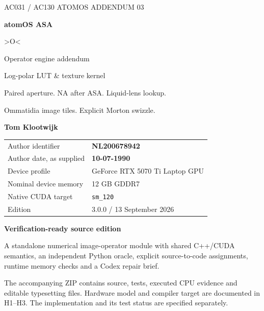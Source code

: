 \documentclass[11pt,a4paper]{article}
\newcommand{\code}[1]{\texttt{#1}}
\begin{document}
\begin{titlepage}
\thispagestyle{empty}
{\sffamily\color{accent}\large AC031 / AC130 ATOMOS \hfill ADDENDUM 03}\par
\vspace{19mm}
{\sffamily\bfseries\fontsize{61}{65}\selectfont\color{ink}atomOS ASA}\par
\vspace{5mm}
{\sffamily\fontsize{40}{44}\selectfont\color{gold}>O<}\par
\vspace{8mm}
{\sffamily\fontsize{25}{31}\selectfont\color{ink}Operator engine addendum\par
Log-polar LUT \& texture kernel}\par
\vspace{8mm}
{\large Paired aperture. NA after ASA. Liquid-lens lookup.\par
Ommatidia image tiles. Explicit Morton swizzle.}\par
\vspace{14mm}
{\sffamily\bfseries\Large Tom Klootwijk}\par
\begin{tabular}{@{}ll@{}}
Author identifier & \textbf{NL200678942}\\
Author date, as supplied & \textbf{10-07-1990}\\
Device profile & GeForce RTX 5070 Ti Laptop GPU\\
Nominal device memory & 12 GB GDDR7\\
Native CUDA target & \code{sm\_120}\\
Edition & 3.0.0 / 13 September 2026\\
\end{tabular}
\vfill
\begin{panel}
\textbf{Verification-ready source edition}\par
A standalone numerical image-operator module with shared C++/CUDA semantics, an independent Python oracle, explicit source-to-code assignments, runtime memory checks and a Codex repair brief.
\end{panel}
{\small\color{muted}The accompanying ZIP contains source, tests, executed CPU evidence and editable typesetting files. Hardware model and compiler target are documented in H1--H3. The implementation and its test status are specified separately.}
\end{titlepage}
\end{document}
